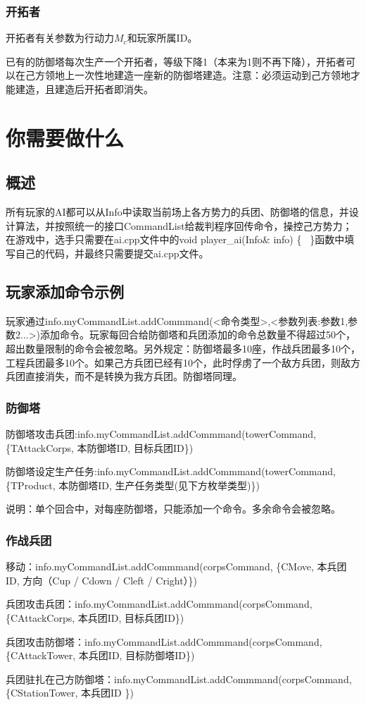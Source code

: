 \documentclass[a4paper,4pt]{article}
\begin{document}
\subsubsection{开拓者}
开拓者有关参数为行动力$M_c$和玩家所属ID。\par
已有的防御塔每次生产一个开拓者，等级下降1（本来为1则不再下降），开拓者可以在己方领地上一次性地建造一座新的防御塔建造。注意：必须运动到己方领地才能建造，且建造后开拓者即消失。




\section{你需要做什么}
\subsection{概述}
所有玩家的AI都可以从Info中读取当前场上各方势力的兵团、防御塔的信息，并设计算法，并按照统一的接口CommandList给裁判程序回传命令，操控己方势力；在游戏中，选手只需要在ai.cpp文件中的void player\_ai(Info\& info) \{ \   \}函数中填写自己的代码，并最终只需要提交ai.cpp文件。

\subsection{玩家添加命令示例}
玩家通过info.myCommandList.addCommmand(<命令类型>,<参数列表:参数1,参数2...>)添加命令。玩家每回合给防御塔和兵团添加的命令总数量不得超过50个，超出数量限制的命令会被忽略。另外规定：防御塔最多10座，作战兵团最多10个，工程兵团最多10个。如果己方兵团已经有10个，此时俘虏了一个敌方兵团，则敌方兵团直接消失，而不是转换为我方兵团。防御塔同理。
\subsubsection{防御塔}
防御塔攻击兵团:info.myCommandList.addCommmand(towerCommand, \{TAttackCorps, 本防御塔ID, 目标兵团ID\})\par
防御塔设定生产任务:info.myCommandList.addCommmand(towerCommand, \{TProduct, 本防御塔ID, 生产任务类型(见下方枚举类型)\})\par
说明：单个回合中，对每座防御塔，只能添加一个命令。多余命令会被忽略。

\subsubsection{作战兵团}
移动：info.myCommandList.addCommmand(corpsCommand, \{CMove, 本兵团ID, 方向（Cup / Cdown / Cleft / Cright）\})\par
兵团攻击兵团：info.myCommandList.addCommmand(corpsCommand, \{CAttackCorps, 本兵团ID, 目标兵团ID\})\par
兵团攻击防御塔：info.myCommandList.addCommmand(corpsCommand, \{CAttackTower, 本兵团ID, 目标防御塔ID\})\par
兵团驻扎在己方防御塔：info.myCommandList.addCommmand(corpsCommand, \{CStationTower, 本兵团ID \}) \par
\end{document}
